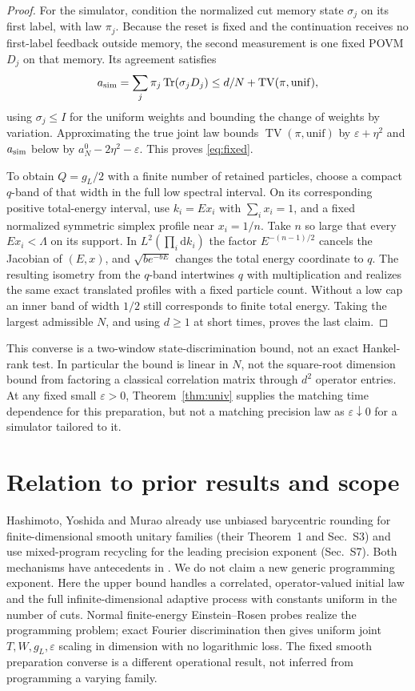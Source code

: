 \documentclass[11pt]{article}
\theoremstyle{remark}
\newcommand{\tr}{\operatorname{Tr}}
\newcommand{\TV}{\operatorname{TV}}
\newcommand{\dd}{\mathrm{d}}
\begin{document}
\begin{proof}
For the simulator, condition the normalized cut memory state
\(\sigma_j\) on its first label, with law \(\pi_j\).
Because the reset is fixed and the continuation receives no
first-label feedback outside memory, the second measurement is
one fixed POVM \(D_j\) on that memory. Its agreement satisfies
\[
 a_{\rm sim}=\sum_j\pi_j\tr(\sigma_jD_j)
       \le d/N+\TV(\pi,\mathrm{unif}),
\]
using \(\sigma_j\le I\) for the uniform weights and bounding the
change of weights by variation. Approximating the true joint law
bounds \(\TV(\pi,\mathrm{unif})\) by \(\varepsilon+\eta^2\)
and \(a_{\rm sim}\) below by \(a_N^0-2\eta^2-\varepsilon\).
This proves \eqref{eq:fixed}.

To obtain \(Q=g_L/2\) with a finite number of retained particles,
choose a compact \(q\)-band of that width in the full low spectral
interval. On its corresponding positive total-energy interval,
use \(k_i=E x_i\) with \(\sum_i x_i=1\), and a fixed
normalized symmetric simplex profile near \(x_i=1/n\). Take
\(n\) so large that every \(E x_i<\Lambda\) on its support. In
\(L^2(\prod_i\dd k_i)\) the factor \(E^{-(n-1)/2}\) cancels the
Jacobian of \((E,x)\), and \(\sqrt{be^{-bE}}\) changes the total
energy coordinate to \(q\). The resulting isometry from the
\(q\)-band intertwines \(q\) with multiplication and realizes the
same exact translated profiles with a fixed particle count.
Without a low cap an inner band of width \(1/2\) still corresponds
to finite total energy. Taking the largest admissible \(N\), and
using \(d\ge1\) at short times, proves the last claim.
\end{proof}

This converse is a two-window state-discrimination bound, not
an exact Hankel-rank test. In particular the bound is linear in
\(N\), not the square-root dimension bound from factoring a
classical correlation matrix through \(d^2\) operator entries.
At any fixed small \(\varepsilon>0\),
Theorem~\ref{thm:univ} supplies the matching time dependence
for this preparation, but not a matching precision law as
\(\varepsilon\downarrow0\) for a simulator tailored to it.

\section{Relation to prior results and scope}

Hashimoto, Yoshida and Murao \cite{HYM} already use unbiased
barycentric rounding for finite-dimensional smooth unitary
families (their Theorem~1 and Sec.~S3) and use mixed-program
recycling for the leading precision exponent (Sec.~S7). Both
mechanisms have antecedents in \cite{Campbell,YRC}. We do not
claim a new generic programming exponent. Here the upper bound
handles a correlated, operator-valued initial law and the full
infinite-dimensional adaptive process with constants uniform in
the number of cuts. Normal finite-energy Einstein--Rosen probes
realize the programming problem; exact Fourier discrimination
then gives uniform joint \(T,W,g_L,\varepsilon\) scaling in
dimension with no logarithmic loss. The fixed smooth preparation
converse is a different operational result, not inferred from
programming a varying family.
\end{document}
